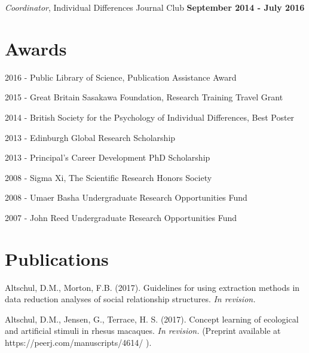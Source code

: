 \documentclass[margin,line]{res}
\newenvironment{list1}{
  \begin{list}{\ding{113}}{%
      \setlength{\itemsep}{0in}
      \setlength{\parsep}{0in} \setlength{\parskip}{0in}
      \setlength{\topsep}{0in} \setlength{\partopsep}{0in} 
      \setlength{\leftmargin}{0.17in}}}{\end{list}}
\begin{document}
\begin{resume}
\vspace{-.2cm}
{\em Coordinator}, Individual Differences Journal Club \hfill   {\bf September 2014 - July 2016}\\
\vspace{-.5cm}


\vspace{0.7cm}

\section{\sc Awards} 
\begin{list1}

\item[2016] - Public Library of Science, Publication Assistance Award
\item[2015] - Great Britain Sasakawa Foundation, Research Training Travel Grant
\item[2014] - British Society for the Psychology of Individual Differences, Best Poster
\item[2013] - Edinburgh Global Research Scholarship
\item[2013] - Principal's Career Development PhD Scholarship
\item[2008] - Sigma Xi, The Scientific Research Honors Society
\item[2008] - Umaer Basha Undergraduate Research Opportunities Fund
\item[2007] - John Reed Undergraduate Research Opportunities Fund

\end{list1}

\vspace{0.7cm}

\section{\sc Publications} 



Altschul, D.M., Morton, F.B. (2017). Guidelines for using extraction methods in data reduction analyses of social relationship structures.  {\it In revision.}


Altschul, D.M., Jensen, G.,  Terrace, H. S. (2017). Concept learning of ecological and artificial stimuli in rhesus macaques. {\it In revision.} (Preprint available at https://peerj.com/manuscripts/4614/ ).


\end{resume}
\end{document}
